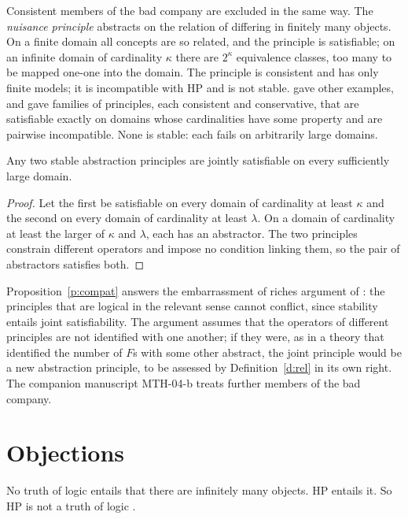 \documentclass{situationist-preprint}
\begin{document}
Consistent members of the bad company are excluded in the same way. The \emph{nuisance principle} \citep{Wright1997} abstracts on the relation of differing in finitely many objects. On a finite domain all concepts are so related, and the principle is satisfiable; on an infinite domain of cardinality $\kappa$ there are $2^\kappa$ equivalence classes, too many to be mapped one-one into the domain. The principle is consistent and has only finite models; it is incompatible with HP and is not stable. \citet{Boolos1990} gave other examples, and \citet{Weir2003} gave families of principles, each consistent and conservative, that are satisfiable exactly on domains whose cardinalities have some property and are pairwise incompatible. None is stable: each fails on arbitrarily large domains.

\begin{proposition}\label{p:compat}
Any two stable abstraction principles are jointly satisfiable on every sufficiently large domain.
\end{proposition}

\begin{proof}
Let the first be satisfiable on every domain of cardinality at least $\kappa$ and the second on every domain of cardinality at least $\lambda$. On a domain of cardinality at least the larger of $\kappa$ and $\lambda$, each has an abstractor. The two principles constrain different operators and impose no condition linking them, so the pair of abstractors satisfies both.
\end{proof}

Proposition~\ref{p:compat} answers the embarrassment of riches argument of \citet{Weir2003}: the principles that are logical in the relevant sense cannot conflict, since stability entails joint satisfiability. The argument assumes that the operators of different principles are not identified with one another; if they were, as in a theory that identified the number of $F$s with some other abstract, the joint principle would be a new abstraction principle, to be assessed by Definition~\ref{d:rel} in its own right. The companion manuscript MTH-04-b treats further members of the bad company.

\section{Objections}\label{s:obj}

\begin{objection}[Infinity]
No truth of logic entails that there are infinitely many objects. HP entails it. So HP is not a truth of logic \citep{Boolos1997}.
\end{objection}
\end{document}

